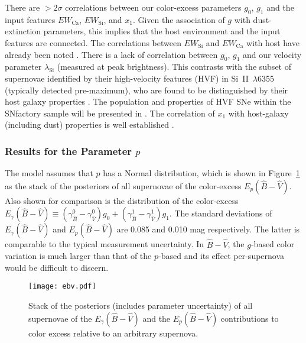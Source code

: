 \documentclass[trackchanges]{aastex62}   	%
\begin{document}
There are $>2 \sigma$ correlations between our  color-excess parameters $g_0$, $g_1$
and the input features  $EW_{\mathrm{Ca}}$,
$EW_{\mathrm{Si}}$, and $x_1$. 
Given the association
of  $g$ with dust-extinction parameters, this implies that the host environment and the input features are connected.
The correlations between $EW_{\mathrm{Si}}$ and  $EW_{\mathrm{Ca}}$  with host have already been noted \citep{2011ApJ...734...42N, 2015MNRAS.451.1973S}.
There is a lack of correlation between  $g_0$, $g_1$ and  our velocity parameter $\lambda_{\mathrm{Si}}$
(measured at peak brightness).
This contrasts with the subset of supernovae identified by their high-velocity features (HVF) in
Si~II~$\lambda$6355
(typically detected pre-maximum), who are found to be distinguished by their host galaxy properties
\citep[e.g.][]{2014MNRAS.444.3258M, 2015MNRAS.446..354P, 2015ApJS..220...20Z}.
The population and properties of HVF SNe within the SNfactory sample will be presented in \citet{2018lin}.
The correlation of $x_1$ with  host-galaxy (including dust) properties is  well established 
\citep{2000AJ....120.1479H, 2003MNRAS.340.1057S}.


\subsubsection{Results for the Parameter $p$}
\label{p:sec}
The model assumes that $p$ has a Normal distribution, which is shown in Figure~\ref{ebv3:fig} as the 
stack of the posteriors of all supernovae of the color-excess $E_p({\hat{B}}-{\hat{V}})$.
Also shown for comparison is the distribution of
the   color-excess $E_\gamma({\hat{B}}-{\hat{V}}) \equiv (\gamma^0_{\hat{B}} -\gamma^0_{\hat{V}}) g_0
+ (\gamma^1_{\hat{B}} -\gamma^1_{\hat{V}}) g_1$.
The standard deviations of  $E_\gamma({\hat{B}}-{\hat{V}})$ and $E_p({\hat{B}}-{\hat{V}})$ are
0.085 %
and 0.010
mag respectively.
The latter is comparable to the typical measurement uncertainty.
In $\hat{B}-\hat{V}$, 
the $g$-based color variation is much larger than that of the $p$-based and its effect per-supernova would be difficult to discern.

\begin{figure}[htbp] %
   \centering
   \texttt{[image: ebv.pdf]}
      \caption{Stack of the posteriors  (includes parameter uncertainty) of all supernovae of the  $E_{\gamma}({\hat{B}}-{\hat{V}})$ 
      and the 
 $E_p({\hat{B}}-{\hat{V}})$  contributions to color excess relative to an arbitrary supernova.
   \label{ebv3:fig}}
\end{figure}
\end{document}
